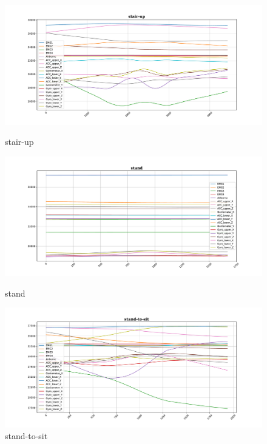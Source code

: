 \begin{figure}[!tbp]
	\begin{minipage}[b]{0.31\textwidth}
		\includegraphics[width=\textwidth]{images/stair-up_example.pdf}
		\caption{stair-up}
	\end{minipage}
	\begin{minipage}[b]{0.31\textwidth}
		\includegraphics[width=\textwidth]{images/stand_example.pdf}
		\caption{stand}
		\label{stand}
	\end{minipage}
	\begin{minipage}[b]{0.31\textwidth}
		\includegraphics[width=\textwidth]{images/stand-to-sit_example.pdf}
		\caption{stand-to-sit}
	\end{minipage}
\end{figure}

